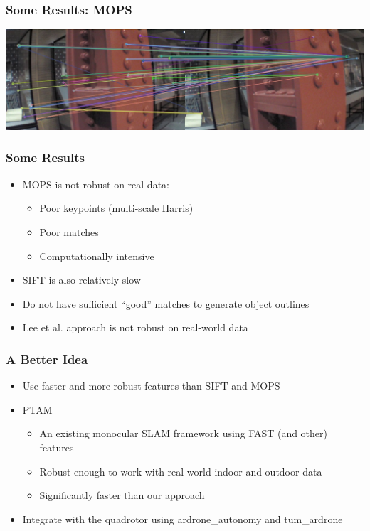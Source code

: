 \documentclass[xcolor=x11names,compress,t]{beamer}
\renewcommand{\(}{\begin{columns}}
\renewcommand{\)}{\end{columns}}
\newcommand{\<}[1]{\begin{column}{#1}}
\renewcommand{\>}{\end{column}}
\begin{document}
\begin{frame}
  \frametitle{Some Results: MOPS}
  \includegraphics[resolution=150, scale=0.52]{images/mops-matches.jpg}
\end{frame}

\begin{frame}
  \frametitle{Some Results}
  \begin{itemize}
  \item MOPS is not robust on real data:
    \begin{itemize}
    \item Poor keypoints (multi-scale Harris)
    \item Poor matches
    \item Computationally intensive
    \end{itemize}
  \item SIFT is also relatively slow
  \item Do not have sufficient ``good'' matches to generate object outlines
  \item Lee et al. approach is not robust on real-world data
  \end{itemize}
\end{frame}

\begin{frame}
  \frametitle{A Better Idea}
  \begin{itemize}
  \item Use faster and more robust features than SIFT and MOPS
  \item PTAM
    \begin{itemize}
    \item An existing monocular SLAM framework using FAST (and other) features
    \item Robust enough to work with real-world indoor and outdoor data
    \item Significantly faster than our approach
    \end{itemize}
  \item Integrate with the quadrotor using ardrone\_autonomy and tum\_ardrone
  \end{itemize}
\end{frame}
\end{document}

